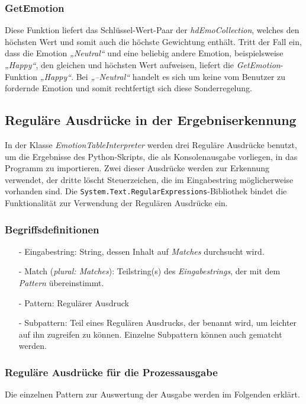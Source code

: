 \documentclass[12pt,a4paper,headinclude,twoside, plainheadsepline, open=right,numbers=noenddot]{scrreprt}
\begin{document}
\subsubsection{GetEmotion}
Diese Funktion liefert das Schl\"{u}ssel-Wert-Paar der \textit{hdEmoCollection}, welches den h\"{o}chsten Wert und somit auch die h\"{o}chste Gewichtung enth\"{a}lt. Tritt der Fall ein, dass die Emotion \textit{„Neutral“} und eine beliebig andere Emotion, beispielsweise \textit{„Happy“}, den gleichen und h\"{o}chsten Wert aufweisen, liefert die \textit{GetEmotion}-Funktion \textit{„Happy“}. Bei \textit{„–Neutral“} handelt es sich um keine vom Benutzer zu fordernde Emotion und somit rechtfertigt sich diese Sonderregelung.

\subsection{Regul\"{a}re Ausdr\"{u}cke in der Ergebniserkennung}
In der Klasse \textit{EmotionTableInterpreter} werden drei Regul\"{a}re Ausdr\"{u}cke benutzt, um die Ergebnisse des Python-Skripts, die als Konsolenausgabe vorliegen, in das Programm zu importieren. Zwei dieser Ausdr\"{u}cke werden zur Erkennung verwendet, der dritte l\"{o}scht Steuerzeichen, die im Eingabestring m\"{o}glicherweise vorhanden sind. Die \texttt{System.Text.RegularExpressions}-Bibliothek bindet die Funktionalit\"{a}t zur Verwendung der Regul\"{a}ren Ausdr\"{u}cke ein.
\subsubsection{Begriffsdefinitionen}
\begin{itemize}
\item[-] Eingabestring: String, dessen Inhalt auf \textit{Matches} durchsucht wird.
\item[-] Match (\textit{plural: Matches}): Teilstring(s) des \textit{Eingabestrings}, der mit dem \textit{Pattern} \"{u}bereinstimmt.
\item[-] Pattern: Regul\"{a}rer Ausdruck
\item[-] Subpattern: Teil eines Regul\"{a}ren Ausdrucks, der benannt wird, um leichter auf ihn zugreifen zu k\"{o}nnen. Einzelne Subpattern k\"{o}nnen auch gematcht werden. 
\end{itemize}
\subsubsection{Regul\"{a}re Ausdr\"{u}cke f\"{u}r die Prozessausgabe}
Die einzelnen Pattern zur Auswertung der Ausgabe werden im Folgenden erkl\"{a}rt.
\end{document}
